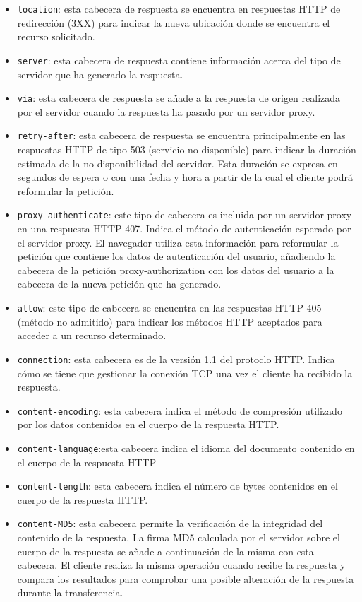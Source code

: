 \documentclass{article}
\begin{document}
	\begin{itemize}
		\item \texttt{location}: esta cabecera de respuesta se encuentra en respuestas HTTP de redirección (3XX) para indicar la nueva ubicación donde se encuentra el recurso solicitado.
		\item \texttt{server}: esta cabecera de respuesta contiene información acerca del tipo de servidor que ha generado la respuesta.
		\item \texttt{via}: esta cabecera de respuesta se añade a la respuesta de origen realizada por el servidor cuando la respuesta ha pasado por un servidor proxy.
		\item \texttt{retry-after}: esta cabecera de respuesta se encuentra principalmente en las respuestas HTTP de tipo 503 (servicio no disponible) para indicar la duración estimada de la no disponibilidad del servidor. Esta duración se expresa en segundos de espera o con una fecha y hora a partir de la cual el cliente podrá reformular la petición.
		\item \texttt{proxy-authenticate}: este tipo de cabecera es incluida por un servidor proxy en una respuesta HTTP 407. Indica el método de autenticación esperado por el servidor proxy. El navegador utiliza esta información para reformular la petición que contiene los datos de autenticación del usuario, añadiendo la cabecera de la petición proxy-authorization con los datos del usuario a la cabecera de la nueva petición que ha generado.
		\item \texttt{allow}: este tipo de cabecera se encuentra en las respuestas HTTP 405 (método no admitido) para indicar los métodos HTTP aceptados para acceder a un recurso determinado.
		\item \texttt{connection}: esta cabecera es de la versión 1.1 del protoclo HTTP. Indica cómo se tiene que gestionar la conexión TCP una vez el cliente ha recibido la respuesta.
		\item \texttt{content-encoding}: esta cabecera indica el método de compresión utilizado por los datos contenidos en el cuerpo de la respuesta HTTP.
		\item \texttt{content-language}:esta cabecera indica el idioma del documento contenido en el cuerpo de la respuesta HTTP
		\item \texttt{content-length}: esta cabecera indica el número de bytes contenidos en el cuerpo de la respuesta HTTP.
		\item \texttt{content-MD5}: esta cabecera permite la verificación de la integridad del contenido de la respuesta. La firma MD5 calculada por el servidor sobre el cuerpo de la respuesta se añade a continuación de la misma con esta cabecera. El cliente realiza la misma operación cuando recibe la respuesta y compara los resultados para comprobar una posible alteración de la respuesta durante la transferencia.

\end{itemize}
\end{document}
